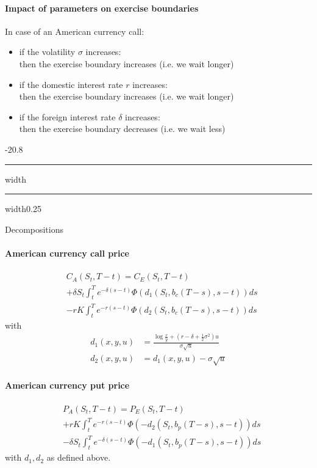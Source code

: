 \documentclass[a4paper,landscape,8pt,fleqn]{scrartcl}
\makeatletter
\renewcommand{\subsection}{\@startsection{subsection}{1}{0mm}%
{-2\baselineskip}{0.8\baselineskip}%
{\hrule depth 0.2pt width\columnwidth\hrule depth0.75pt
width0.25\columnwidth\vspace*{1.2em}\large\bfseries}}
\makeatother
\begin{document}
\begin{multicols*}{4}
\paragraph{Impact of parameters on exercise boundaries}
In case of an American currency call:
\begin{itemize}
\item if the volatility $\sigma$ increases: \\
then the exercise boundary increases (i.e. we wait longer)
\item if the domestic interest rate $r$ increases: \\
then the exercise boundary increases (i.e. we wait longer)
\item if the foreign interest rate $\delta$ increases: \\
then the exercise boundary decreases (i.e. we wait less)
\end{itemize}

\subsection{Decompositions}

\paragraph{American currency call price}
\begin{align*}
& C_A(S_t,T-t) = C_E(S_t,T-t) \\
&+ \delta S_t \int_t^T e^{-\delta (s-t)} \Phi(d_1(S_t,b_c(T-s),s-t)) ds \\
&- r K \int_t^T e^{-r(s-t)} \Phi(d_2(S_t,b_c(T-s),s-t)) ds
\end{align*}
with
\begin{align*}
d_1(x,y,u) &= \frac{\log \frac{x}{y} + \left( r-\delta+\frac{1}{2}\sigma^2 \right) u}{\sigma \sqrt{u}} \\
d_2(x,y,u) &= d_1(x,y,u) - \sigma \sqrt{u}
\end{align*}

\paragraph{American currency put price}
\begin{align*}
& P_A(S_t,T-t) = P_E(S_t,T-t) \\
&+ r K \int_t^T e^{-r(s-t)} \Phi(-d_2(S_t,b_p(T-s),s-t)) ds \\
&- \delta S_t \int_t^T e^{-\delta (s-t)} \Phi(-d_1(S_t,b_p(T-s),s-t)) ds
\end{align*}
with $d_1, d_2$ as defined above.


\end{multicols*}
\end{document}
